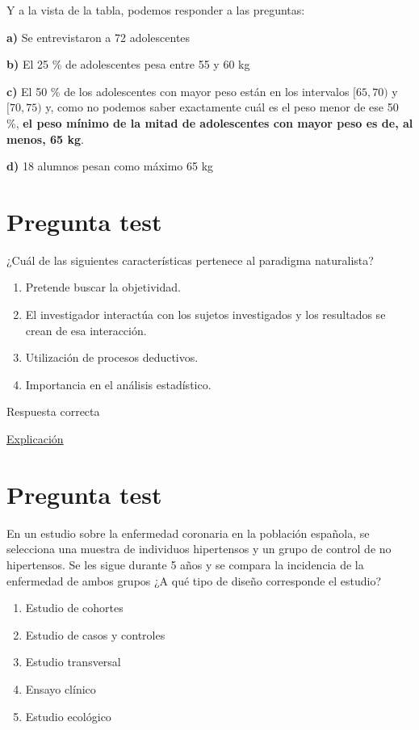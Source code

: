 \documentclass[
]{book}
\providecommand{\tightlist}{%
  \setlength{\itemsep}{0pt}\setlength{\parskip}{0pt}}
\begin{document}
Y a la vista de la tabla, podemos responder a las preguntas:

\textbf{a)} Se entrevistaron a 72 adolescentes

\textbf{b)} El 25 \% de adolescentes pesa entre 55 y 60 kg

\textbf{c)} El 50 \% de los adolescentes con mayor peso están en los intervalos \([65,70)\) y \([70,75)\) y, como no podemos saber exactamente cuál es el peso menor de ese 50 \%, \textbf{el peso mínimo de la mitad de adolescentes con mayor peso es de, al menos, 65 kg}.

\textbf{d)} 18 alumnos pesan como máximo 65 kg

\hypertarget{pregunta-test-13}{%
\section{Pregunta test}\label{pregunta-test-13}}

¿Cuál de las siguientes características pertenece al paradigma naturalista?

\begin{enumerate}
\def\labelenumi{\alph{enumi})}
\tightlist
\item
  Pretende buscar la objetividad.
\item
  El investigador interactúa con los sujetos investigados y los resultados se crean de esa interacción.
\item
  Utilización de procesos deductivos.
\item
  Importancia en el análisis estadístico.
\end{enumerate}

Respuesta correcta

\href{https://www.encyclo.co.uk/meaning-of-Naturalistic_paradigm}{Explicación}

\hypertarget{pregunta-test-14}{%
\section{Pregunta test}\label{pregunta-test-14}}

En un estudio sobre la enfermedad coronaria en la población española, se selecciona una muestra de individuos hipertensos y un grupo de control de no hipertensos. Se les sigue durante 5 años y se compara la incidencia de la enfermedad de ambos grupos ¿A qué tipo de diseño corresponde el estudio?

\begin{enumerate}
\def\labelenumi{\alph{enumi})}
\tightlist
\item
  Estudio de cohortes
\item
  Estudio de casos y controles
\item
  Estudio transversal
\item
  Ensayo clínico
\item
  Estudio ecológico
\end{enumerate}
\end{document}
